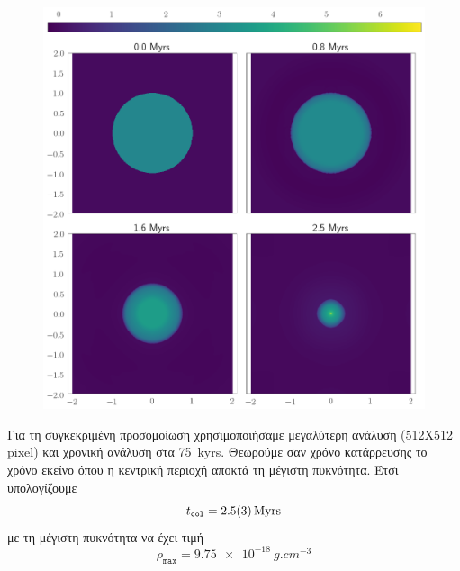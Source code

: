 \begin{figure}[h]
	\centering
	\includegraphics[width=1\linewidth]{DataImages/H2CoolGRquad}
	\caption{}
	\label{fig:h2coolgrquad}
\end{figure}

Για τη συγκεκριμένη προσομοίωση χρησιμοποιήσαμε μεγαλύτερη ανάλυση (512X512 pixel) και χρονική ανάλυση στα \SI{75}{kyrs}. Θεωρούμε σαν χρόνο κατάρρευσης το χρόνο εκείνο όπου η κεντρική περιοχή αποκτά τη μέγιστη πυκνότητα. Έτσι υπολογίζουμε 
\begin{equation}
t_\mathtt{col}=\SI{2.5\pm 0.3}{Myrs}
\end{equation}
με τη μέγιστη πυκνότητα να έχει τιμή
\begin{equation}
\rho _\mathtt{max}=\SI{9.75e-18}{g.cm^{-3}}
\end{equation}

%
%	
%	
	
